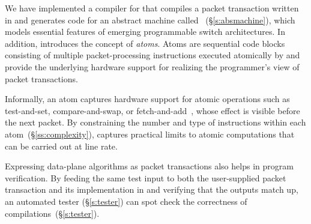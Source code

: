We have implemented a compiler for \pktlanguage that compiles a packet
transaction written in \pktlanguage and generates code for an abstract machine
called \absmachine~(\S\ref{s:absmachine}), which models essential features of
emerging programmable switch architectures.  In addition, \absmachine
introduces the concept of {\em atoms}. Atoms are sequential code blocks
consisting of multiple packet-processing instructions executed atomically by
\absmachine and provide the underlying hardware support for realizing the
programmer's view of packet transactions.

Informally, an atom captures hardware support for atomic operations such as
test-and-set, compare-and-swap, or fetch-and-add~\cite{faa}, whose effect is
visible before the next packet. By constraining the number and type of
instructions within each atom~(\S\ref{ss:complexity}), \absmachine captures
practical limits to atomic computations that can be carried out at line rate.



Expressing data-plane algorithms as packet transactions also helps in program
verification.  By feeding the same test input to both
the user-supplied packet transaction and its implementation in \absmachine and
verifying that the outputs match up, an automated tester (\S\ref{s:tester}) can
spot check the correctness of compilations~(\S\ref{s:tester}).

